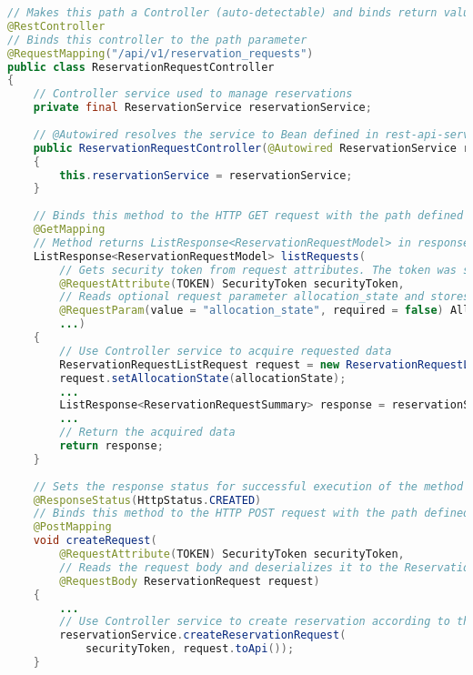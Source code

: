 \begin{lstlisting}[language=java, caption=ReservationRequestController.java, label=lst:controller]
// Makes this path a Controller (auto-detectable) and binds return values of methods to the HTTP request body
@RestController
// Binds this controller to the path parameter
@RequestMapping("/api/v1/reservation_requests")
public class ReservationRequestController
{
    // Controller service used to manage reservations
    private final ReservationService reservationService;
    
    // @Autowired resolves the service to Bean defined in rest-api-servlet.xml
    public ReservationRequestController(@Autowired ReservationService reservationService)
    {
        this.reservationService = reservationService;
    }
    
    // Binds this method to the HTTP GET request with the path defined in @RequestMapping
    @GetMapping
    // Method returns ListResponse<ReservationRequestModel> in response body thanks to @RestController annotation
    ListResponse<ReservationRequestModel> listRequests(
        // Gets security token from request attributes. The token was stored there when AuthFilter processed the request.
        @RequestAttribute(TOKEN) SecurityToken securityToken,
        // Reads optional request parameter allocation_state and stores it in allocationState variable
        @RequestParam(value = "allocation_state", required = false) AllocationState allocationState,
        ...)
    {
        // Use Controller service to acquire requested data
        ReservationRequestListRequest request = new ReservationRequestListRequest();
        request.setAllocationState(allocationState);
        ...
        ListResponse<ReservationRequestSummary> response = reservationService.listReservationRequests(request);
        ...
        // Return the acquired data
        return response;
    }
    
    // Sets the response status for successful execution of the method
    @ResponseStatus(HttpStatus.CREATED)
    // Binds this method to the HTTP POST request with the path defined in @RequestMapping
    @PostMapping
    void createRequest(
        @RequestAttribute(TOKEN) SecurityToken securityToken,
        // Reads the request body and deserializes it to the ReservationRequest object
        @RequestBody ReservationRequest request)
    {
        ...
        // Use Controller service to create reservation according to the requested data
        reservationService.createReservationRequest(
            securityToken, request.toApi());
    }
    

\end{lstlisting}
